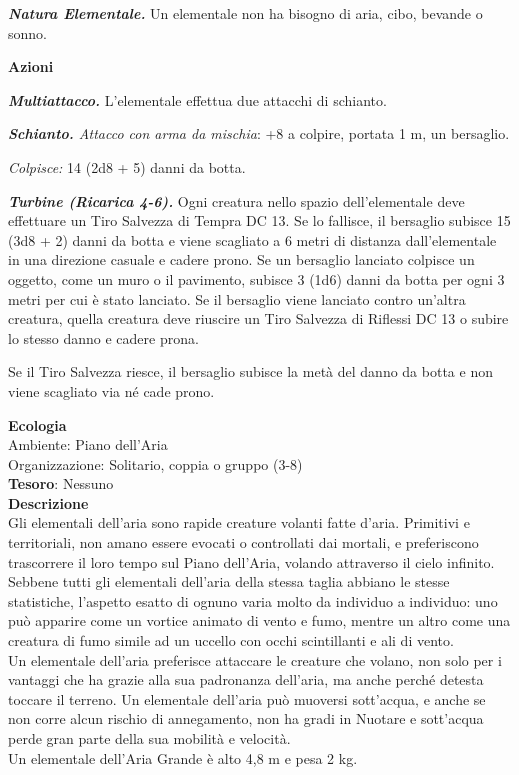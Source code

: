 \begin{multicols}{2}
\textit{\textbf{Natura Elementale.}} Un elementale non ha bisogno di aria, cibo, bevande o sonno.

\textbf{Azioni}

\textit{\textbf{Multiattacco.}} L'elementale effettua due attacchi di schianto.

\textit{\textbf{Schianto.} Attacco con arma da mischia}: +8 a colpire, portata 1 m, un bersaglio.

\textit{Colpisce:} 14 (2d8 + 5) danni da botta.

\textit{\textbf{Turbine (Ricarica 4-6).}} Ogni creatura nello spazio dell'elementale deve effettuare un Tiro Salvezza di Tempra DC 13. Se lo fallisce, il bersaglio subisce 15 (3d8 + 2) danni da botta e viene scagliato a 6 metri di distanza dall'elementale in una direzione casuale e cadere prono. Se un bersaglio lanciato colpisce un oggetto, come un muro o il pavimento, subisce 3 (1d6) danni da botta per ogni 3 metri per cui è stato lanciato. Se il bersaglio viene lanciato contro un'altra creatura, quella creatura deve riuscire un Tiro Salvezza di Riflessi DC 13 o subire lo stesso danno e cadere prona.

Se il Tiro Salvezza riesce, il bersaglio subisce la metà del danno da botta e non viene scagliato via né cade prono.

\textbf{Ecologia}\\
Ambiente: Piano dell'Aria\\
Organizzazione: Solitario, coppia o gruppo (3-8)\\
\textbf{Tesoro}: Nessuno\\
\textbf{Descrizione}\\
Gli elementali dell'aria sono rapide creature volanti fatte d'aria. Primitivi e territoriali, non amano essere evocati o controllati dai mortali, e preferiscono trascorrere il loro tempo sul Piano dell'Aria, volando attraverso il cielo infinito.\\
Sebbene tutti gli elementali dell'aria della stessa taglia abbiano le stesse statistiche, l'aspetto esatto di ognuno varia molto da individuo a individuo: uno può apparire come un vortice animato di vento e fumo, mentre un altro come una creatura di fumo simile ad un uccello con occhi scintillanti e ali di vento.\\
Un elementale dell'aria preferisce attaccare le creature che volano, non solo per i vantaggi che ha grazie alla sua padronanza dell'aria, ma anche perché detesta toccare il terreno. Un elementale dell'aria può muoversi sott'acqua, e anche se non corre alcun rischio di annegamento, non ha gradi in Nuotare e sott'acqua perde gran parte della sua mobilità e velocità.\\
Un elementale dell'Aria Grande è alto 4,8 m e pesa 2 kg.


\end{multicols}
